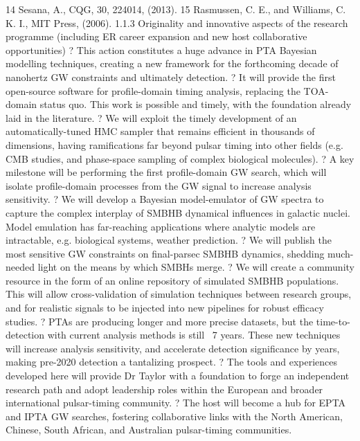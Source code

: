 \documentclass[11pt,letterpaper,sans]{moderncv} %
\begin{document}
14 Sesana, A., CQG, 30, 224014, (2013).	15 Rasmussen, C. E., and Williams, C. K. I., MIT Press, (2006). 
1.1.3  Originality and innovative aspects of the research programme (including ER career expansion and new host collaborative opportunities) 
?	This action constitutes a huge advance in PTA Bayesian modelling techniques, creating a new framework for the forthcoming decade of nanohertz GW constraints and ultimately detection.
?	It will provide the first open-source software for profile-domain timing analysis, replacing the TOA-domain status quo. This work is possible and timely, with the foundation already laid in the literature. 
?	We will exploit the timely development of an automatically-tuned HMC sampler that remains efficient in thousands of dimensions, having ramifications far beyond pulsar timing into other fields (e.g. CMB studies, and phase-space sampling of complex biological molecules).
?	A key milestone will be performing the first profile-domain GW search, which will isolate profile-domain processes from the GW signal to increase analysis sensitivity. 
?	We will develop a Bayesian model-emulator of GW spectra to capture the complex interplay of SMBHB dynamical influences in galactic nuclei. Model emulation has far-reaching applications where analytic models are intractable, e.g. biological systems, weather prediction.
?	We will publish the most sensitive GW constraints on final-parsec SMBHB dynamics, shedding much-needed light on the means by which SMBHs merge.
?	We will create a community resource in the form of an online repository of simulated SMBHB populations. This will allow cross-validation of simulation techniques between research groups, and for realistic signals to be injected into new pipelines for robust efficacy studies.
?	PTAs are producing longer and more precise datasets, but the time-to-detection with current analysis methods is still ~7 years. These new techniques will increase analysis sensitivity, and accelerate detection significance by years, making pre-2020 detection a tantalizing prospect.
?	The tools and experiences developed here will provide Dr Taylor with a foundation to forge an independent research path and adopt leadership roles within the European and broader international pulsar-timing community.
?	The host will become a hub for EPTA and IPTA GW searches, fostering collaborative links with the North American, Chinese, South African, and Australian pulsar-timing communities.
\end{document}

